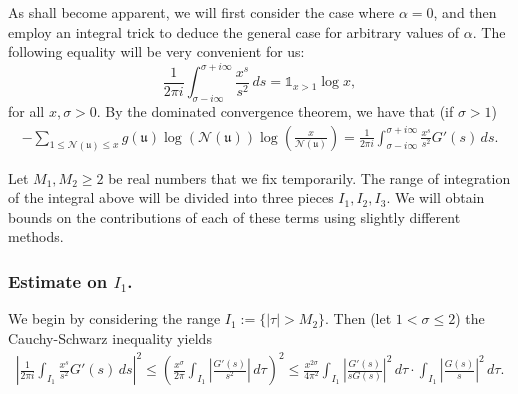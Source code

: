 \documentclass[11pt]{amsart}
\theoremstyle{definition}
\newcommand{\NN}{{\mathcal N}}
\newcommand{\R}{{\mathbb R}}
\newcommand{\Z}{{\mathbb Z}}
\newcommand{\mf}{\mathfrak}
\begin{document}
As shall become apparent, we will first consider the case where $\alpha=0$, and then employ an integral trick to deduce the general case for arbitrary values of $\alpha$. The following equality will be very convenient for us:
  $$\frac{1}{2\pi i}\int_{\sigma-i\infty}^{\sigma+i\infty}\frac{x^{s}}{s^{2}}\,ds=\mathds{1}_{x>1}\log x,$$
for all $x,\sigma>0$. By the dominated convergence theorem, %
we have that  (if $\sigma>1$)
 \begin{equation}\label{1234}
    \begin{split}
       -\sum_{1 \leq \NN(\mf u)\leq x}g(\mf u)\log(\NN(\mf u))\log\left(\frac{x}{\NN(\mf u)}\right)=\frac{1}{2\pi i}\int_{\sigma-i\infty}^{\sigma+i\infty}\frac{x^{s}}{s^{2}}G'(s)\,ds.
    \end{split}
 \end{equation}
 
 Let $M_{1},M_{2}\geq 2$ be real numbers that we fix temporarily. The range of integration of the integral above will be divided into three pieces $I_1, I_2, I_3$. We will obtain bounds on the contributions of each of these terms using slightly different methods.

 \subsubsection{Estimate on $I_{1}$.}
 We begin by considering the range $I_{1}:= \{ \vert\tau\vert>M_{2}\}$. Then (let $1<\sigma\leq 2$) the Cauchy-Schwarz inequality yields
  \begin{equation}\label{a1}
    \begin{split}
       \left|\frac{1}{2\pi i}\int_{I_{1}}\frac{x^{s}}{s^{2}}G'(s)\,ds\right|^{2}
       \leq \left(\frac{x^{\sigma}}{2\pi}\int_{I_{1}}\left|\frac{G'(s)}{s^{2}}\right|\,d\tau \right)^{2}
       \leq  \frac{x^{2\sigma}}{4\pi^{2}}\int_{I_{1}}\left|\frac{G'(s)}{s G(s)}\right|^{2}\,d\tau\cdot \int_{I_{1}}\left|\frac{G(s)}{s}\right|^{2}\,d\tau.
    \end{split}
 \end{equation}
\end{document}
